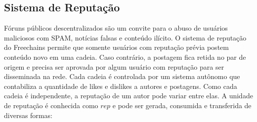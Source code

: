 \documentclass[12pt]{article}
\newcommand{\FC} {Freechains\xspace}
\begin{document}
\subsection{Sistema de Reputação}
\label{sec.freechains.reps}

Fóruns públicos descentralizados são um convite para o abuso de usuários
maliciosos com SPAM, notícias falsas e conteúdo ilícito.
O sistema de reputação do \FC permite que somente usuários com reputação prévia
postem conteúdo novo em uma cadeia.
Caso contrário, a postagem fica retida no par de origem e precisa ser aprovada
por algum usuário com reputação para ser disseminada na rede.
Cada cadeia é controlada por um sistema autônomo que contabiliza a quantidade
de likes e dislikes a autores e postagens.
Como cada cadeia é independente, a reputação de um autor pode variar entre
elas.
A unidade de reputação é conhecida como $rep$ e pode ser gerada, consumida e
transferida de diversas formas:
%
\end{document}

